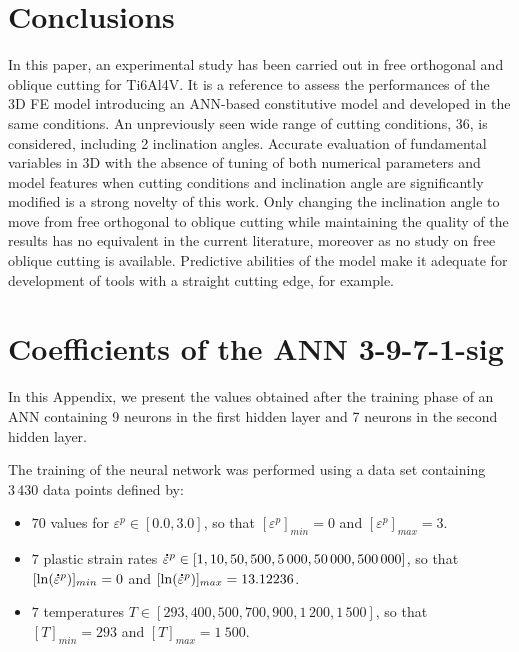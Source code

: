 \documentclass[final,5p,times,twocolumn]{elsarticle}
\newcommand{\mdot}[1]{\accentset{\mbox{\bfseries .}}{#1}}
\begin{document}
\section{Conclusions}

In this paper, an experimental study has been carried out in free orthogonal and oblique cutting for Ti6Al4V. It is a reference to assess the performances of the 3D FE model introducing an ANN-based constitutive model and developed in the same conditions. An unpreviously seen wide range of cutting conditions, 36, is considered, including 2 inclination angles.
Accurate evaluation of fundamental variables in 3D with the absence of tuning of both numerical parameters and model features when cutting conditions and inclination angle are significantly modified is a strong novelty of this work. Only changing the inclination angle to move from free orthogonal to oblique cutting while maintaining the quality of the results has no equivalent in the current literature, moreover as no study on free oblique cutting is available. Predictive abilities of the model make it adequate for development of tools with a straight cutting edge, for example.

\appendix
%
\section{Coefficients of the ANN 3-9-7-1-sig\label{sec:appendix-1}}

In this Appendix, we present the values obtained after the training phase of an ANN containing 9 neurons in the first hidden layer and 7 neurons in the second hidden layer.

The training of the neural network was performed using a data set containing $3\,430$ data points defined by:
\begin{itemize}
\item $70$ values for $\varepsilon^p\in[0.0,3.0]$, so that $[\varepsilon^p]_{min}=0$ and $[\varepsilon^p]_{max}=3$.
\item $7$ plastic strain rates $\mdot{\varepsilon}^p\in[1, 10, 50, 500, 5\,000, 50\,000, 500\,000]$, so that $[\ln(\mdot{\varepsilon}^p)]_{min}=0$ and $[\ln(\mdot{\varepsilon}^p)]_{max}=13.12236$.
\item  $7$ temperatures $T\in[293, 400, 500, 700, 900, 1\,200, 1\,500]$, so that $[T]_{min}=293$ and $[T]_{max}=1\ 500$.
\end{itemize}
\end{document}

